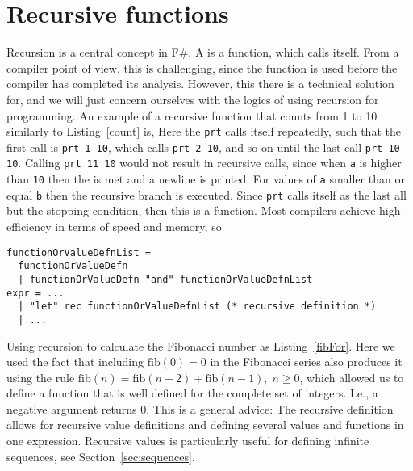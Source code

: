 \section{Recursive functions}
Recursion is a central concept in F\#. A  is a function, which calls itself. From a compiler point of view, this is challenging, since the function is used before the compiler has completed its analysis. However, this there is a technical solution for, and we will just concern ourselves with the logics of using recursion for programming. An example of a recursive function that counts from 1 to 10 similarly to Listing~\ref{count} is,
%
%
Here the \lstinline!prt! calls itself repeatedly, such that the first call is \lstinline!prt 1 10!, which calls \lstinline!prt 2 10!, and so on until the last call \lstinline!prt 10 10!. Calling \lstinline!prt 11 10! would not result in recursive calls, since when \lstinline!a! is higher than \lstinline!10! then the  is met and a newline is printed. For values of \lstinline!a! smaller than or equal \lstinline!b! then the recursive branch is executed. Since \lstinline!prt! calls itself as the last all but the stopping condition, then this is a  function. Most compilers achieve high efficiency in terms of speed and memory, so 
\begin{lstlisting}[language=ebnf]
functionOrValueDefnList = 
  functionOrValueDefn 
  | functionOrValueDefn "and" functionOrValueDefnList
expr = ... 
  | "let" rec functionOrValueDefnList (* recursive definition *)
  | ...
\end{lstlisting}
Using recursion to calculate the Fibonacci number as Listing~\ref{fibFor}.
%
%
Here we used the fact that including $\text{fib}(0)=0$ in the Fibonacci series also produces it using the rule $\text{fib}(n)=\text{fib}(n-2)+\text{fib}(n-1),\; n\geq 0$, which allowed us to define a function that is well defined for the complete set of integers. I.e., a negative argument returns 0. This is a general advice:  The recursive definition allows for recursive value definitions and defining several values and functions in one expression. Recursive values is particularly useful for defining infinite sequences, see Section~\ref{sec:sequences}.




